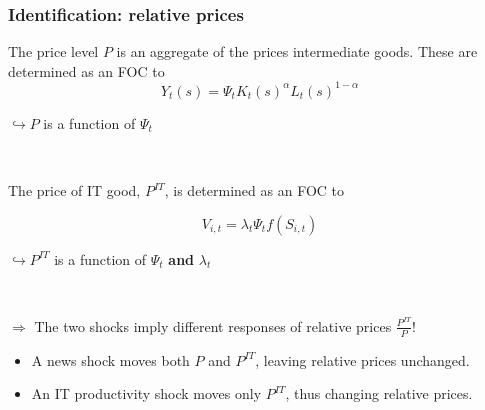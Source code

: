 \documentclass{beamer}
\begin{document}
\begin{frame}
	\frametitle{Identification: relative prices}

The price level $P$ is an aggregate of the prices intermediate goods. These are determined as an FOC to 
\begin{equation*}
Y_t(s) = \Psi_t K_t(s)^{\alpha}L_t(s)^{1-\alpha}
\end{equation*}

\hspace{5cm} $\hookrightarrow P$ is a function of $\Psi_t$ 

\

The price of IT good, $P^{IT}$, is determined as an FOC to

\begin{equation}
V_{i,t} = \lambda_t \Psi_t f(S_{i,t})
\end{equation}


\hspace{5cm}  $\hookrightarrow P^{IT}$ is a function of $\Psi_t$ \textbf{and} $\lambda_t$	

\

$\Rightarrow$ The two shocks imply different responses of relative prices $\frac{P^{IT}}{P}$!

\begin{itemize}
\item A news shock moves both $P$ and $P^{IT}$, leaving relative prices unchanged.
\item An IT productivity shock moves only $P^{IT}$, thus changing relative prices.
\end{itemize}



\end{frame}
\end{document}
